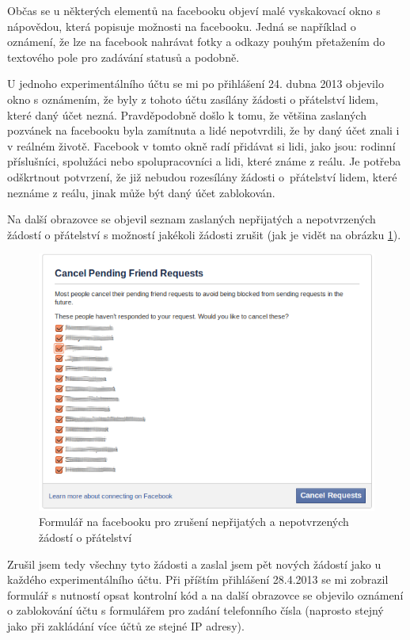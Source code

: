 \documentclass[thesis=M,czech]{FITthesis}[2013/05/10]
\begin{document}
Občas se u některých elementů na facebooku objeví malé vyskakovací okno s nápovědou, která popisuje možnosti na facebooku. Jedná se například o oznámení, že lze na facebook nahrávat fotky a odkazy pouhým přetažením do textového pole pro zadávání statusů a podobně. 

U jednoho experimentálního účtu se mi po přihlášení 24. dubna 2013 objevilo okno s oznámením, že byly z tohoto účtu zasílány žádosti o přátelství lidem, které daný účet nezná. Pravděpodobně došlo k tomu, že většina zaslaných pozvánek na facebooku byla zamítnuta a lidé nepotvrdili, že by daný účet znali i v reálném životě. Facebook v tomto okně radí přidávat si lidi, jako jsou: rodinní příslušníci, spolužáci nebo spolupracovníci a lidi, které známe z reálu. Je potřeba odškrtnout potvrzení, že již nebudou rozesílány žádosti o~přátelství lidem, které neznáme z reálu, jinak může být daný účet zablokován.

Na další obrazovce se objevil seznam zaslaných nepřijatých a nepotvrzených žádostí o přátelství s možností jakékoli žádosti zrušit (jak je vidět na obrázku \ref{fig:cancelPendingFrinedRequests}).

\begin{figure}[h]
\begin{center}
\includegraphics[width=5in]{figures/cancelPendingFriendRequests.png}
\caption{Formulář na facebooku pro zrušení nepřijatých  a nepotvrzených žádostí o přátelství}
\label{fig:cancelPendingFrinedRequests}
\end{center}
\end{figure}

Zrušil jsem tedy všechny tyto žádosti a zaslal jsem pět nových žádostí jako u každého experimentálního účtu. Při příštím přihlášení 28.4.2013 se mi zobrazil formulář s nutností opsat kontrolní kód a na další obrazovce se objevilo oznámení o zablokování účtu s formulářem pro zadání telefonního čísla (naprosto stejný jako při zakládání více účtů ze stejné IP adresy).
\end{document}
